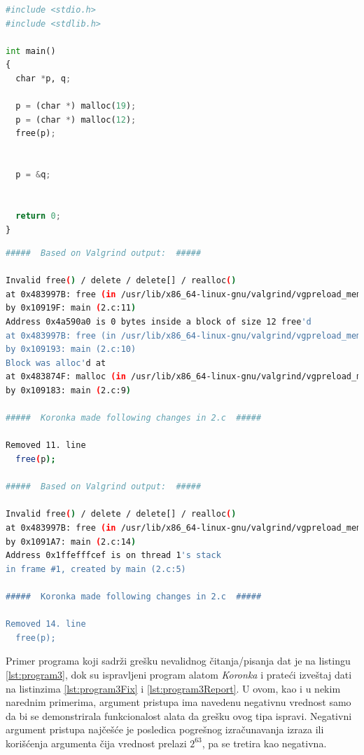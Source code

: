 \documentclass[12pt,oneside]{memoir}
\theoremstyle{plain}
\theoremstyle{definition}
\begin{document}
\begin{lstlisting}[style=mystyle,caption={Predlog rešenja alata \textit{Koronka} za greške otkrivene u programu sa listinga \ref{lst:program2}}, label={lst:program2Fix},language={Python}] 
#include <stdio.h>
#include <stdlib.h>

int main()
{
  char *p, q;

  p = (char *) malloc(19);
  p = (char *) malloc(12);
  free(p);


  p = &q;

  				
  return 0;
}
\end{lstlisting}

\begin{lstlisting}[style=terminal,caption={Izveštaj o radu alata \textit{Koronka} za program sa listinga \ref{lst:program2}}, label={lst:program2Report},language={bash}]   
#####  Based on Valgrind output:  #####

Invalid free() / delete / delete[] / realloc()
at 0x483997B: free (in /usr/lib/x86_64-linux-gnu/valgrind/vgpreload_memcheck-amd64-linux.so)
by 0x10919F: main (2.c:11)
Address 0x4a590a0 is 0 bytes inside a block of size 12 free'd
at 0x483997B: free (in /usr/lib/x86_64-linux-gnu/valgrind/vgpreload_memcheck-amd64-linux.so)
by 0x109193: main (2.c:10)
Block was alloc'd at
at 0x483874F: malloc (in /usr/lib/x86_64-linux-gnu/valgrind/vgpreload_memcheck-amd64-linux.so)
by 0x109183: main (2.c:9)

#####  Koronka made following changes in 2.c  #####

Removed 11. line
  free(p);

#####  Based on Valgrind output:  #####

Invalid free() / delete / delete[] / realloc()
at 0x483997B: free (in /usr/lib/x86_64-linux-gnu/valgrind/vgpreload_memcheck-amd64-linux.so)
by 0x1091A7: main (2.c:14)
Address 0x1ffefffcef is on thread 1's stack
in frame #1, created by main (2.c:5)

#####  Koronka made following changes in 2.c  #####

Removed 14. line
  free(p); 			
\end{lstlisting}

Primer programa koji sadrži grešku nevalidnog čitanja/pisanja dat je na listingu \ref{lst:program3}, dok su ispravljeni program alatom \textit{Koronka} i prateći izveštaj dati na listinzima \ref{lst:program3Fix} i \ref{lst:program3Report}. U ovom, kao i u nekim narednim primerima, argument pristupa ima navedenu negativnu vrednost samo da bi se demonstrirala funkcionalost alata da grešku ovog tipa ispravi. Negativni argument pristupa najčešće je posledica pogrešnog izračunavanja izraza ili korišćenja argumenta čija vrednost prelazi $2^{63}$, pa se tretira kao negativna.
\end{document}
